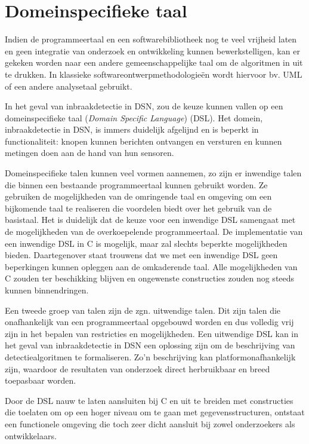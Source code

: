 \section{Domeinspecifieke taal}
\label{section:solution-dsl}

Indien de programmeertaal en een softwarebibliotheek nog te veel vrijheid laten
en geen integratie van onderzoek en ontwikkeling kunnen bewerkstelligen, kan er
gekeken worden naar een andere gemeenschappelijke taal om de algoritmen in uit
te drukken. In klassieke softwareontwerpmethodologie\"en wordt hiervoor bv. UML
\citep{url:uml} of een andere analysetaal gebruikt.

In het geval van inbraakdetectie in DSN, zou de keuze kunnen vallen op een
domeinspecifieke taal (\emph{Domain Specific Language})
(DSL)\citep{van2000domain, mernik2005and, fowler2010domain}. Het domein,
inbraakdetectie in DSN, is immers duidelijk afgelijnd en is beperkt in
functionaliteit: knopen kunnen berichten ontvangen en versturen en kunnen
metingen doen aan de hand van hun sensoren.

Domeinspecifieke talen kunnen veel vormen aannemen, zo zijn er inwendige talen
die binnen een bestaande programmeertaal kunnen gebruikt worden. Ze gebruiken
de mogelijkheden van de omringende taal en omgeving om een bijkomende taal te
realiseren die voordelen biedt over het gebruik van de basistaal. Het is
duidelijk dat de keuze voor een inwendige DSL samengaat met de mogelijkheden
van de overkoepelende programmeertaal. De implementatie van een inwendige DSL
in C is mogelijk, maar zal slechts beperkte mogelijkheden bieden. Daartegenover
staat trouwens dat we met een inwendige DSL geen beperkingen kunnen opleggen
aan de omkaderende taal. Alle mogelijkheden van C zouden ter beschikking
blijven en ongewenste constructies zouden nog steeds kunnen binnendringen.

Een tweede groep van talen zijn de zgn. uitwendige talen. Dit zijn talen die
onafhankelijk van een programmeertaal opgebouwd worden en dus volledig vrij
zijn in het bepalen van restricties en mogelijkheden. Een uitwendige DSL kan in
het geval van inbraakdetectie in DSN een oplossing zijn om de beschrijving van
detectiealgoritmen te formaliseren. Zo'n beschrijving kan platformonafhankelijk
zijn, waardoor de resultaten van onderzoek direct herbruikbaar en breed
toepasbaar worden.

Door de DSL nauw te laten aansluiten bij C en uit te breiden met constructies
die toelaten om op een hoger niveau om te gaan met gegevensstructuren, ontstaat
een functionele omgeving die toch zeer dicht aansluit bij zowel onderzoekers
als ontwikkelaars.

